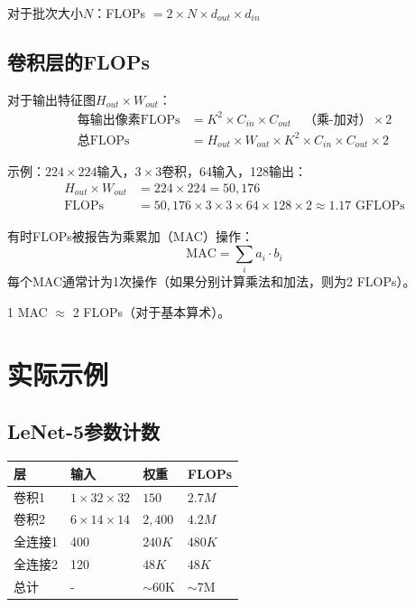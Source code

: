 对于批次大小$N$：FLOPs $= 2 \times N \times d_{out} \times d_{in}$

\subsection{卷积层的FLOPs}

对于输出特征图$H_{out} \times W_{out}$：
\begin{align}
\text{每输出像素FLOPs} &= K^2 \times C_{in} \times C_{out} \quad \text{（乘-加对）} \times 2 \\
\text{总FLOPs} &= H_{out} \times W_{out} \times K^2 \times C_{in} \times C_{out} \times 2
\end{align}

示例：$224\times224$输入，$3\times3$卷积，64输入，128输出：
\begin{align}
H_{out} \times W_{out} &= 224 \times 224 = 50,176 \\
\text{FLOPs} &= 50,176 \times 3 \times 3 \times 64 \times 128 \times 2 \approx 1.17 \text{ GFLOPs}
\end{align}

\begin{note}
有时FLOPs被报告为乘累加（MAC）操作：
\begin{equation}
\text{MAC} = \sum_{i} a_i \cdot b_i
\end{equation}
每个MAC通常计为1次操作（如果分别计算乘法和加法，则为2 FLOPs）。

1 MAC $\approx$ 2 FLOPs（对于基本算术）。
\end{note}

\section{实际示例}

\subsection{LeNet-5参数计数}

\begin{table}[ht]
    \centering
    \begin{tabular}{L{2.5cm} L{2cm} L{2cm} L{2cm}}
        \toprule
        \textbf{层} & \textbf{输入} & \textbf{权重} & \textbf{FLOPs} \\
        \midrule
        卷积1 & $1\times32\times32$ & $150$ & $2.7M$ \\
        卷积2 & $6\times14\times14$ & $2,400$ & $4.2M$ \\
        全连接1 & 400 & $240K$ & $480K$ \\
        全连接2 & 120 & $48K$ & $48K$ \\
        \midrule
        总计 & - & $\sim$60K & $\sim$7M \\
        \bottomrule
    \end{tabular}
\end{table}


